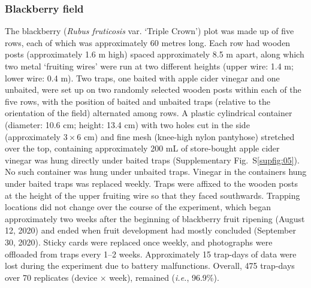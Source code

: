 \documentclass[12pt]{article}
\begin{document}
\begin{linenumbers}
		\subsubsection*{Blackberry field}
		The blackberry (\emph{Rubus fruticosis} var. ‘Triple Crown’) plot was made up of five rows, each of which was approximately 60 metres long. Each row had wooden posts (approximately 1.6 m high) spaced approximately 8.5 m apart, along which two metal ‘fruiting wires’ were run at two different heights (upper wire: 1.4 m; lower wire: 0.4 m). Two traps, one baited with apple cider vinegar and one unbaited, were set up on two randomly selected wooden posts within each of the five rows, with the position of baited and unbaited traps (relative to the orientation of the field) alternated among rows. A plastic cylindrical container (diameter: 10.6 cm; height: 13.4 cm) with two holes cut in the side (approximately $3 \times{} 6$ cm) and fine mesh (knee-high nylon pantyhose) stretched over the top, containing approximately 200 mL of store-bought apple cider vinegar was hung directly under baited traps
		(Supplementary Fig.~S\ref{supfig:05}). No such container was hung under unbaited traps. Vinegar in the containers hung under baited traps was replaced weekly. Traps were affixed to the wooden posts at the height of the upper fruiting wire so that they faced southwards. Trapping locations did not change over the course of the experiment, which began approximately two weeks after the beginning of blackberry fruit ripening (August 12, 2020) and ended when fruit development had mostly concluded (September 30, 2020). Sticky cards were replaced once weekly, and photographs were offloaded from traps every 1–2 weeks. Approximately 15 trap-days of data were lost during the experiment due to battery malfunctions. Overall, 475 trap-days over 70 replicates (device $\times{}$ week), remained (\emph{i.e.}, 96.9\%).


\end{linenumbers}
\end{document}
